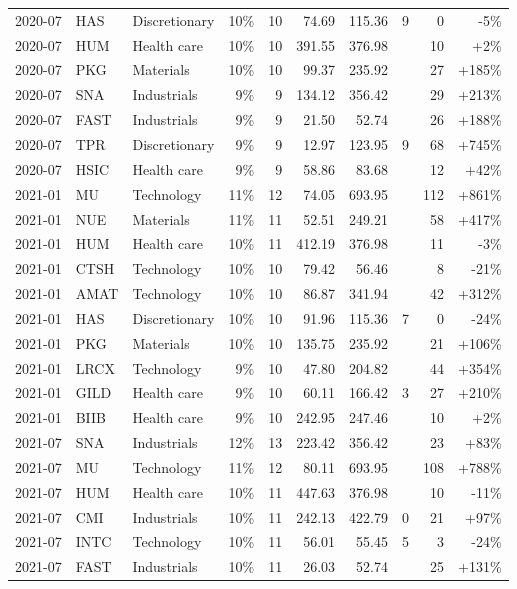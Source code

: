 \documentclass[11pt,a4paper]{article}
\begin{document}
{\begin{longtable}{l l l r r r r r r r}
2020-07 & HAS & Discretionary & 10\% & 10 & 74.69 & 115.36 & 9 & 0 & -5\% \\
2020-07 & HUM & Health care & 10\% & 10 & 391.55 & 376.98 &  & 10 & +2\% \\
2020-07 & PKG & Materials & 10\% & 10 & 99.37 & 235.92 &  & 27 & +185\% \\
2020-07 & SNA & Industrials & 9\% & 9 & 134.12 & 356.42 &  & 29 & +213\% \\
2020-07 & FAST & Industrials & 9\% & 9 & 21.50 & 52.74 &  & 26 & +188\% \\
2020-07 & TPR & Discretionary & 9\% & 9 & 12.97 & 123.95 & 9 & 68 & +745\% \\
2020-07 & HSIC & Health care & 9\% & 9 & 58.86 & 83.68 &  & 12 & +42\% \\
2021-01 & MU & Technology & 11\% & 12 & 74.05 & 693.95 &  & 112 & +861\% \\
2021-01 & NUE & Materials & 11\% & 11 & 52.51 & 249.21 &  & 58 & +417\% \\
2021-01 & HUM & Health care & 10\% & 11 & 412.19 & 376.98 &  & 11 & -3\% \\
2021-01 & CTSH & Technology & 10\% & 10 & 79.42 & 56.46 &  & 8 & -21\% \\
2021-01 & AMAT & Technology & 10\% & 10 & 86.87 & 341.94 &  & 42 & +312\% \\
2021-01 & HAS & Discretionary & 10\% & 10 & 91.96 & 115.36 & 7 & 0 & -24\% \\
2021-01 & PKG & Materials & 10\% & 10 & 135.75 & 235.92 &  & 21 & +106\% \\
2021-01 & LRCX & Technology & 9\% & 10 & 47.80 & 204.82 &  & 44 & +354\% \\
2021-01 & GILD & Health care & 9\% & 10 & 60.11 & 166.42 & 3 & 27 & +210\% \\
2021-01 & BIIB & Health care & 9\% & 10 & 242.95 & 247.46 &  & 10 & +2\% \\
2021-07 & SNA & Industrials & 12\% & 13 & 223.42 & 356.42 &  & 23 & +83\% \\
2021-07 & MU & Technology & 11\% & 12 & 80.11 & 693.95 &  & 108 & +788\% \\
2021-07 & HUM & Health care & 10\% & 11 & 447.63 & 376.98 &  & 10 & -11\% \\
2021-07 & CMI & Industrials & 10\% & 11 & 242.13 & 422.79 & 0 & 21 & +97\% \\
2021-07 & INTC & Technology & 10\% & 11 & 56.01 & 55.45 & 5 & 3 & -24\% \\
2021-07 & FAST & Industrials & 10\% & 11 & 26.03 & 52.74 &  & 25 & +131\% \\

\end{longtable}}
\end{document}
